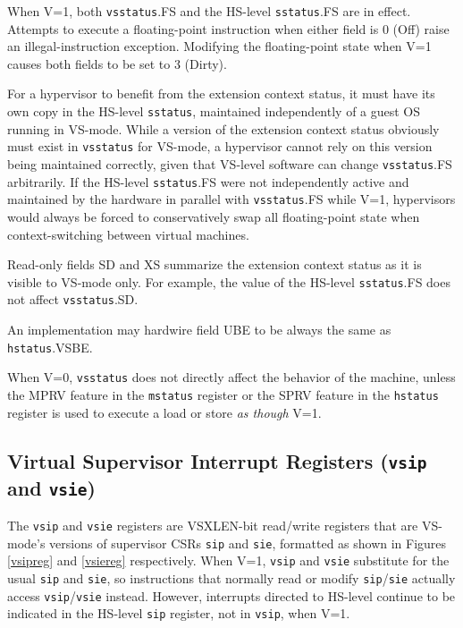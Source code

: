 When V=1, both {\tt vsstatus}.FS and the HS-level {\tt sstatus}.FS are in
effect.  Attempts
to execute a floating-point instruction when either field is 0 (Off) raise an
illegal-instruction exception.  Modifying the floating-point state when V=1
causes both fields to be set to 3 (Dirty).

\begin{commentary}
For a hypervisor to benefit from the extension context status, it must
have its own copy in the HS-level {\tt sstatus}, maintained independently
of a guest OS running in VS-mode.
While a version of the extension context status obviously must exist in
{\tt vsstatus} for VS-mode, a hypervisor cannot rely on this version
being maintained correctly, given that VS-level software can change
{\tt vsstatus}.FS arbitrarily.
If the HS-level {\tt sstatus}.FS were not independently active and
maintained by the hardware in parallel with {\tt vsstatus}.FS while V=1,
hypervisors would always be forced to conservatively swap all
floating-point state when context-switching between virtual machines.
\end{commentary}

Read-only fields SD and XS summarize the extension context status as it
is visible to VS-mode only.
For example, the value of the HS-level {\tt sstatus}.FS does not affect
{\tt vsstatus}.SD.

An implementation may hardwire field UBE to be always the same as
{\tt hstatus}.VSBE.

When V=0, {\tt vsstatus} does not directly affect the behavior of the machine,
unless the MPRV feature in the {\tt mstatus} register or the SPRV feature
in the {\tt hstatus} register is used to execute a load or store
{\em as though} V=1.

\subsection{Virtual Supervisor Interrupt Registers ({\tt vsip} and {\tt vsie})}

The {\tt vsip} and {\tt vsie} registers are VSXLEN-bit read/write
registers that are VS-mode's versions of supervisor CSRs {\tt sip} and
{\tt sie}, formatted as shown in Figures \ref{vsipreg} and \ref{vsiereg}
respectively.
When V=1, {\tt vsip} and {\tt vsie} substitute for the usual {\tt sip}
and {\tt sie}, so instructions that normally read or modify
{\tt sip}/{\tt sie} actually access {\tt vsip}/{\tt vsie} instead.
However, interrupts directed to HS-level continue to be
indicated in the HS-level {\tt sip} register, not in {\tt vsip}, when
V=1.

